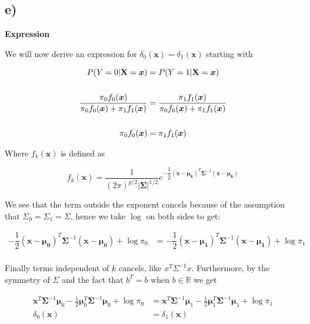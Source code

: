 \documentclass[
]{article}
\begin{document}
\hypertarget{e-2}{%
\subsection{e)}\label{e-2}}

\textbf{Expression }

We will now derive an expression for
\(\delta_0({\boldsymbol x}) = \delta_1({\boldsymbol x})\) starting with

\[
\begin{aligned}
P(Y=0 | {\bf X}={\boldsymbol x}) &= P(Y=1 | {\bf X}={\boldsymbol x}) \\
\\
\frac{\pi_0 f_0({\boldsymbol x})}{\pi_0 f_0({\boldsymbol x}) + \pi_1 f_1({\boldsymbol x})} 
&= \frac{\pi_1 f_1({\boldsymbol x})}{\pi_0 f_0({\boldsymbol x}) + \pi_1 f_1({\boldsymbol x})} \\
\\
\pi_0 f_0({\boldsymbol x})
&= \pi_1 f_1({\boldsymbol x})
\end{aligned}
\]

Where \(f_k(\boldsymbol{x})\) is defined as

\[
f_k({\boldsymbol x}) = \frac{1}{(2 \pi)^{p/2}|\boldsymbol{\Sigma}|^{1/2}}e^{-\dfrac{1}{2}({\boldsymbol x}-\boldsymbol{\mu_k})^T \boldsymbol{\Sigma}^{-1}({\boldsymbol x}-\boldsymbol{\mu_k})}
\]

We see that the term outside the exponent cancels because of the
assumption that \(\Sigma_0 = \Sigma_1 = \Sigma\), hence we take \(\log\)
on both sides to get:

\[
\begin{aligned}
-\dfrac{1}{2}({\boldsymbol x}-\boldsymbol{\mu_0})^T \boldsymbol{\Sigma}^{-1}({\boldsymbol x}-\boldsymbol{\mu_0}) + \log\pi_0
&= -\dfrac{1}{2}({\boldsymbol x}-\boldsymbol{\mu_1})^T \boldsymbol{\Sigma}^{-1}({\boldsymbol x}-\boldsymbol{\mu_1}) + \log\pi_1 \\
\end{aligned}
\]

Finally terms independent of \(k\) cancels, like \(x^T\Sigma^{-1}x\).
Furthermore, by the symmetry of \(\Sigma\) and the fact that \(b^T = b\)
when \(b \in \mathbb{R}\) we get

\[
\begin{aligned}
{\boldsymbol x}^T \boldsymbol{\Sigma}^{-1}\boldsymbol{\mu}_0 - \frac{1}{2}\boldsymbol{\mu}_0^T \boldsymbol{\Sigma}^{-1}\boldsymbol{\mu}_0 + \log \pi_0
&=
{\boldsymbol x}^T \boldsymbol{\Sigma}^{-1}\boldsymbol{\mu}_1 - \frac{1}{2}\boldsymbol{\mu}_1^T \boldsymbol{\Sigma}^{-1}\boldsymbol{\mu}_1 + \log \pi_1 \\
\delta_0({\boldsymbol x}) &= \delta_1({\boldsymbol x})
\end{aligned}
\]
\end{document}

